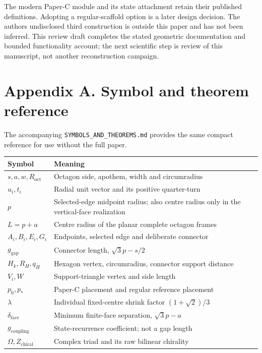 \documentclass[
  11pt,
  a4paper,
]{article}
\newcounter{none} %
\begin{document}
The modern Paper-C module and its state attachment retain their published definitions. Adopting a regular-scaffold option is a later design decision. The author\textquotesingle s undisclosed third construction is outside this paper and has not been inferred. This review draft completes the stated geometric documentation and bounded functionality account; the next scientific step is review of this manuscript, not another reconstruction campaign.

\appendix

\section{Appendix A. Symbol and theorem reference}\label{appendix-a.-symbol-and-theorem-reference}

The accompanying \texttt{SYMBOLS\_AND\_THEOREMS.md} provides the same compact reference for use without the full paper.

{\def\LTcaptype{none} %
\begin{longtable}[]{@{}
  >{\raggedright\arraybackslash}p{}
  >{\raggedright\arraybackslash}p{}@{}}
\toprule\noalign{}
\begin{minipage}[b]{\linewidth}\raggedright
Symbol
\end{minipage} & \begin{minipage}[b]{\linewidth}\raggedright
Meaning
\end{minipage} \\
\midrule\noalign{}
\endhead
\bottomrule\noalign{}
\endlastfoot
\(s,a,w,R_{\mathrm{oct}}\) & Octagon side, apothem, width and circumradius \\
\(u_i,t_i\) & Radial unit vector and its positive quarter-turn \\
\(p\) & Selected-edge midpoint radius; also centre radius only in the vertical-face realization \\
\(L=p+a\) & Centre radius of the planar complete octagon frames \\
\(A_i,B_i,E_i,G_i\) & Endpoints, selected edge and deliberate connector \\
\(g_{\mathrm{gap}}\) & Connector length, \(\sqrt3p-s/2\) \\
\(H_k,R_H,q_H\) & Hexagon vertex, circumradius, connector support distance \\
\(V_i,W\) & Support-triangle vertex and side length \\
\(p_0,p_*\) & Paper-C placement and regular reference placement \\
\(\lambda\) & Individual fixed-centre shrink factor \((1+\sqrt2)/3\) \\
\(\delta_{\mathrm{face}}\) & Minimum finite-face separation, \(\sqrt3p-a\) \\
\(g_{\mathrm{coupling}}\) & State-recurrence coefficient; not a gap length \\
\(\Omega,Z_{\mathrm{chiral}}\) & Complex triad and its raw bilinear chirality \\
\end{longtable}
}
\end{document}
